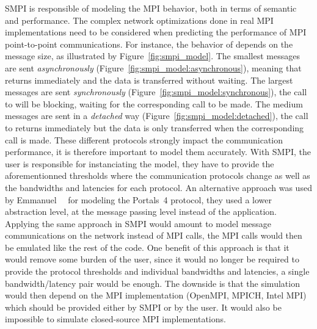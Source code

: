        SMPI is responsible of modeling the MPI behavior, both in terms of semantic and performance. The complex network
        optimizations done in real MPI implementations need to be considered when predicting the performance of MPI
        point-to-point communications. For instance, the behavior of \send depends on the message size, as illustrated
        by Figure~\ref{fig:smpi_model}. The smallest messages are sent \emph{asynchronously}
        (Figure~\ref{fig:smpi_model:asynchronous}), meaning that \send returns immediately and the data is transferred
        without waiting. The largest messages are sent \emph{synchronously} (Figure~\ref{fig:smpi_model:synchronous}),
        \ie the call to \send will be blocking, waiting for the corresponding \recv call to be made. The medium messages
        are sent in a \emph{detached} way (Figure~\ref{fig:smpi_model:detached}), the call to \send returns immediately
        but the data is only transferred when the corresponding \recv call is made.  These different protocols strongly
        impact the communication performance, it is therefore important to model them accurately. With SMPI, the user is
        responsible for instanciating the model, \ie they have to provide the aforementionned thresholds where the
        communication protocols change as well as the bandwidths and latencies for each protocol.  An alternative
        approach was used by Emmanuel~\etal~\cite{emmanuel:hal-02972297} for modeling the Portals~4 protocol, they used
        a lower abstraction level, at the message passing level instead of the application. Applying the same approach
        in SMPI would amount to model message communications on the network instead of MPI calls, the MPI calls would
        then be emulated like the rest of the code. One benefit of this approach is that it would remove some burden of
        the user, since it would no longer be required to provide the protocol thresholds and individual bandwidths and
        latencies, a single bandwidth/latency pair would be enough. The downside is that the simulation would then
        depend on the MPI implementation (\eg OpenMPI, MPICH, Intel MPI) which should be provided either by SMPI or by
        the user. It would also be impossible to simulate closed-source MPI implementations.

